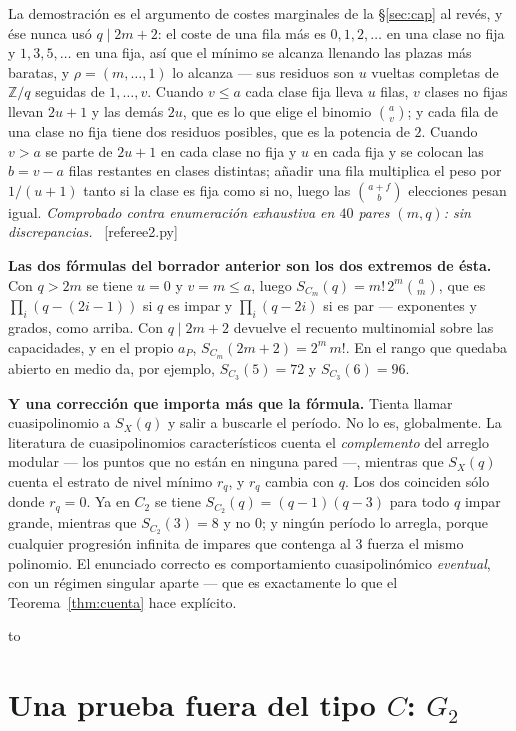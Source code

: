 \documentclass[11pt,a4paper]{article}
\newcommand{\ver}[1]{\unskip\penalty0\ \textcolor{azul}{\small\textsf{[#1]}}}
\newenvironment{keybox}
  {\par\vspace{9pt}\begin{lrbox}{\fichabox}%
   \begin{minipage}{0.90\textwidth}\vspace{7pt}\setlength{\parskip}{3pt}}
  {\vspace{7pt}\end{minipage}\end{lrbox}%
   \par\noindent\hbox to \textwidth{\hfill
   \textcolor{azul}{\rule[-\dp\fichabox]{3.2pt}{\dimexpr\ht\fichabox+\dp\fichabox\relax}}%
   \colorbox{fondoficha}{\usebox{\fichabox}}\hfill}%
   \par\vspace{9pt}}
\begin{document}
\noindent La demostración es el argumento de costes marginales de la \S\ref{sec:cap} al revés, y ése
nunca usó $q\mid 2m+2$: el coste de una fila más es $0,1,2,\dots$ en una clase no fija y
$1,3,5,\dots$ en una fija, así que el mínimo se alcanza llenando las plazas más baratas, y
$\rho=(m,\dots,1)$ lo alcanza --- sus residuos son $u$ vueltas completas de $\mathbb{Z}/q$ seguidas de
$1,\dots,v$. Cuando $v\le a$ cada clase fija lleva $u$ filas, $v$ clases no fijas llevan $2u+1$ y
las demás $2u$, que es lo que elige el binomio $\binom{a}{v}$; y cada fila de una clase no fija tiene
dos residuos posibles, que es la potencia de $2$. Cuando $v>a$ se parte de $2u+1$ en cada clase no
fija y $u$ en cada fija y se colocan las $b=v-a$ filas restantes en clases distintas; añadir una fila
multiplica el peso por $1/(u+1)$ tanto si la clase es fija como si no, luego las $\binom{a+f}{b}$
elecciones pesan igual. \emph{Comprobado contra enumeración exhaustiva en $40$ pares $(m,q)$: sin
discrepancias.} \ver{referee2.py}

\noindent \textbf{Las dos fórmulas del borrador anterior son los dos extremos de ésta.} Con $q>2m$
se tiene $u=0$ y $v=m\le a$, luego $S_{C_m}(q)=m!\,2^m\binom{a}{m}$, que es $\prod_i(q-(2i-1))$ si
$q$ es impar y $\prod_i(q-2i)$ si es par --- exponentes y grados, como arriba. Con $q\mid 2m+2$
devuelve el recuento multinomial sobre las capacidades, y en el propio $a_P$,
$S_{C_m}(2m+2)=2^m\,m!$. En el rango que quedaba abierto en medio da, por ejemplo,
$S_{C_3}(5)=72$ y $S_{C_3}(6)=96$.

\begin{keybox}
\textbf{Y una corrección que importa más que la fórmula.} Tienta llamar cuasipolinomio a $S_X(q)$ y
salir a buscarle el período. No lo es, globalmente. La literatura de cuasipolinomios característicos
cuenta el \emph{complemento} del arreglo modular --- los puntos que no están en ninguna pared ---,
mientras que $S_X(q)$ cuenta el estrato de nivel mínimo $r_q$, y $r_q$ cambia con $q$. Los dos
coinciden sólo donde $r_q=0$. Ya en $C_2$ se tiene $S_{C_2}(q)=(q-1)(q-3)$ para todo $q$ impar
grande, mientras que $S_{C_2}(3)=8$ y no $0$; y ningún período lo arregla, porque cualquier
progresión infinita de impares que contenga al $3$ fuerza el mismo polinomio. El enunciado correcto
es comportamiento cuasipolinómico \emph{eventual}, con un régimen singular aparte --- que es
exactamente lo que el Teorema~\ref{thm:cuenta} hace explícito.
\end{keybox}

\section{Una prueba fuera del tipo $C$: $G_2$}\label{sec:g2}
\end{document}

